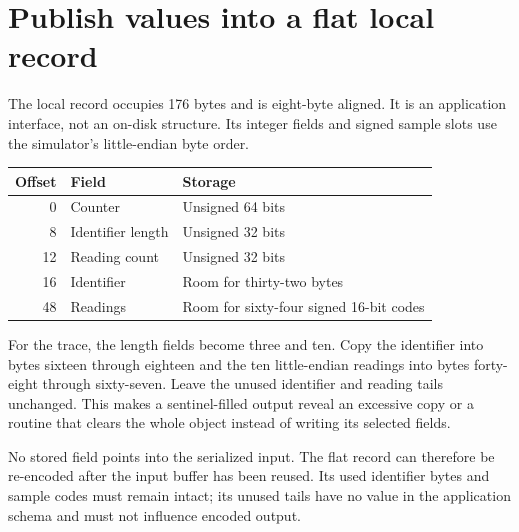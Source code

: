 \section{Publish values into a flat local record}
The local record occupies 176 bytes and is eight-byte aligned. It is an application
interface, not an on-disk structure. Its integer fields and signed sample slots use
the simulator's little-endian byte order.

\begin{center}
\begin{tabular}{rll}
Offset & Field & Storage \\
\hline
0 & Counter & Unsigned 64 bits \\
8 & Identifier length & Unsigned 32 bits \\
12 & Reading count & Unsigned 32 bits \\
16 & Identifier & Room for thirty-two bytes \\
48 & Readings & Room for sixty-four signed 16-bit codes \\
\end{tabular}
\end{center}

For the trace, the length fields become three and ten. Copy the identifier into bytes
sixteen through eighteen and the ten little-endian readings into bytes forty-eight
through sixty-seven. Leave the unused identifier and reading tails unchanged. This
makes a sentinel-filled output reveal an excessive copy or a routine that clears the
whole object instead of writing its selected fields.

No stored field points into the serialized input. The flat record can therefore be
re-encoded after the input buffer has been reused. Its used identifier bytes and sample
codes must remain intact; its unused tails have no value in the application schema and
must not influence encoded output.
